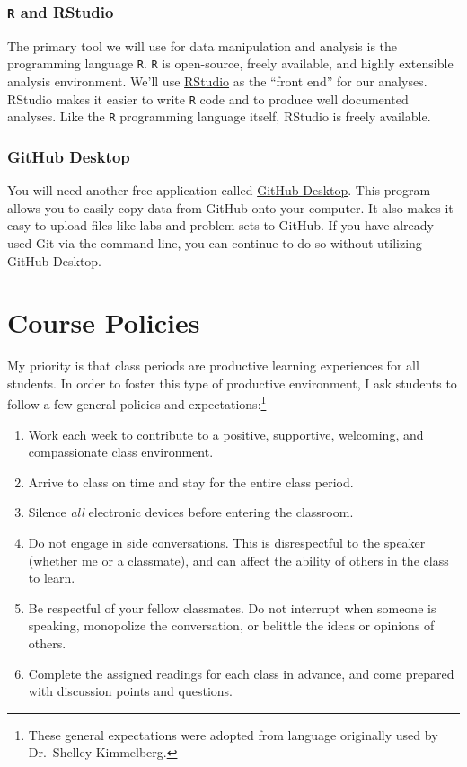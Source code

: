 \documentclass[
]{book}
\providecommand{\tightlist}{%
  \setlength{\itemsep}{0pt}\setlength{\parskip}{0pt}}
\begin{document}
\hypertarget{r-and-rstudio}{%
\subsection{\texorpdfstring{\texttt{R} and RStudio}{R and RStudio}}\label{r-and-rstudio}}

The primary tool we will use for data manipulation and analysis is the programming language \texttt{R}. \texttt{R} is open-source, freely available, and highly extensible analysis environment. We'll use \href{https://www.rstudio.com}{RStudio} as the ``front end'' for our analyses. RStudio makes it easier to write \texttt{R} code and to produce well documented analyses. Like the \texttt{R} programming language itself, RStudio is freely available.

\hypertarget{github-desktop}{%
\subsection{GitHub Desktop}\label{github-desktop}}

You will need another free application called \href{https://desktop.github.com}{GitHub Desktop}. This program allows you to easily copy data from GitHub onto your computer. It also makes it easy to upload files like labs and problem sets to GitHub. If you have already used Git via the command line, you can continue to do so without utilizing GitHub Desktop.

\hypertarget{course-policies}{%
\chapter{Course Policies}\label{course-policies}}

My priority is that class periods are productive learning experiences for all students. In order to foster this type of productive environment, I ask students to follow a few general policies and expectations:\footnote{These general expectations were adopted from language originally used by Dr.~Shelley Kimmelberg.}

\begin{enumerate}
\def\labelenumi{\arabic{enumi}.}
\tightlist
\item
  Work each week to contribute to a positive, supportive, welcoming, and compassionate class environment.
\item
  Arrive to class on time and stay for the entire class period.
\item
  Silence \emph{all} electronic devices before entering the classroom.
\item
  Do not engage in side conversations. This is disrespectful to the speaker (whether me or a classmate), and can affect the ability of others in the class to learn.
\item
  Be respectful of your fellow classmates. Do not interrupt when someone is speaking, monopolize the conversation, or belittle the ideas or opinions of others.
\item
  Complete the assigned readings for each class in advance, and come prepared with discussion points and questions.
\end{enumerate}
\end{document}
